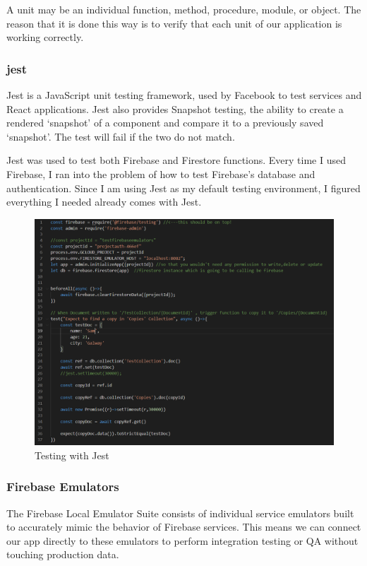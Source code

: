 A unit may be an individual function, method, procedure, module, or object.
The reason that it is done this way is to verify that each unit of our application is working correctly.


\subsubsection{jest}
Jest is a JavaScript unit testing framework, used by Facebook to test services and React applications.
Jest also provides Snapshot testing, the ability to create a rendered ‘snapshot’ of a component and compare it to a previously saved ‘snapshot’. The test will fail if the two do not match.

Jest was used to test both Firebase and Firestore functions.
Every time I used Firebase, I ran into the problem of how to test Firebase's database and authentication. Since I am using Jest as my default testing environment, I figured everything I needed already comes with Jest.

\begin{figure}
    \centering
    \includegraphics[scale=0.5]{img/jest.PNG}
    \caption{Testing with Jest}
    \label{fig:my_label4}
\end{figure}

\subsubsection{Firebase Emulators}
The Firebase Local Emulator Suite consists of individual service emulators built to accurately mimic the behavior of Firebase services. This means we can connect our app directly to these emulators to perform integration testing or QA without touching production data.

